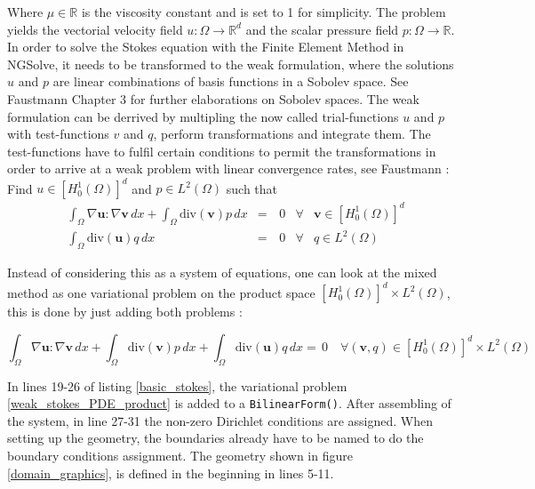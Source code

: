 \null

Where $\mu \in \mathbb{R}$ is the viscosity constant and is set to 1 for simplicity. 
The problem yields the vectorial velocity field $u:\Omega \rightarrow \mathbb{R}^d$ and 
the scalar pressure field $p:\Omega \rightarrow \mathbb{R}$. In order to solve the Stokes equation with the Finite Element Method in NGSolve,
it needs to be transformed to the weak formulation, where the solutions $u$ and $p$ are linear combinations of basis functions in a Sobolev space.
See Faustmann\cite{lecture_notes_faustmann_numPDE} Chapter 3 for further elaborations on Sobolev spaces. The weak formulation can be derrived by
multipling the now called trial-functions $u$ and $p$ with test-functions $v$ and $q$, perform transformations and integrate them. The test-functions have to fulfil certain
conditions to permit the transformations in order to arrive at a weak problem with 
linear convergence rates, see Faustmann \cite{lecture_notes_faustmann_numPDE}: \\

Find $u \in [H^1_0(\Omega)]^d$ and $p \in L^2(\Omega)$ such that
\begin{equation}\label{weak_stokes_PDE}
    \begin{aligned}
    &\int_{\Omega} \nabla \mathbf{u} : \nabla \mathbf{v} \, dx + \int_{\Omega} \mathrm{div}(\mathbf{v})p \, dx &=& \, 0 &\forall& \mathbf{v} \in [H^1_0(\Omega)]^d \\
    &\int_{\Omega} \mathrm{div}(\mathbf{u})q \, dx &=& \, 0   &\forall& q \in L^2(\Omega)
    \end{aligned}
\end{equation}

\null

Instead of considering this as a system of equations, one can look at the mixed method as one variational problem on
the product space $[H^1_0(\Omega)]^d \times L^2(\Omega)$, this is done by just adding both problems \cite{lecture_notes_faustmann_numPDE}:

\null

\begin{equation}\label{weak_stokes_PDE_product}
    \int_{\Omega} \nabla \mathbf{u} : \nabla \mathbf{v} \, dx + \int_{\Omega} \mathrm{div}(\mathbf{v})p \, 
    dx + \int_{\Omega} \mathrm{div}(\mathbf{u})q \, dx = \, 0 \quad \forall (\mathbf{v},q)
    \in  [H^1_0(\Omega)]^d \times L^2(\Omega)
\end{equation}

\null

In lines 19-26 of listing \ref{basic_stokes}, the variational problem \ref{weak_stokes_PDE_product} is added to
a \texttt{BilinearForm()}. After assembling of the system, in line 27-31 the non-zero Dirichlet conditions are assigned. 
When setting up the geometry, the boundaries already have to be named to do the boundary conditions assignment. The geometry
shown in figure \ref{domain_graphics}, is defined in the beginning in lines 5-11.


